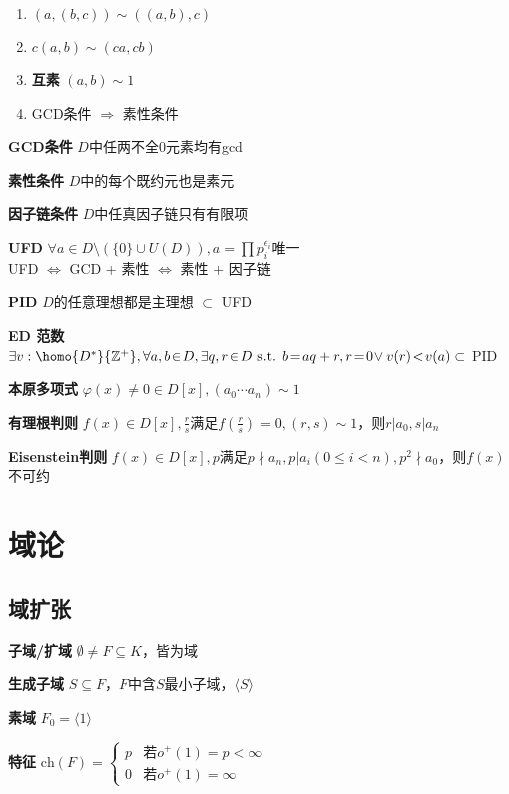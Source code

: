 \documentclass[a4paper,10pt]{ctexart}
\newcommand*{\setZ}{\mathbb{Z}}
\newcommand*{\st}{\text{ s.t. }}
\newcommand*{\impl}{\Rightarrow}
\renewcommand*{\iff}{\Leftrightarrow}
\renewcommand*{\leq}{\leqslant}
\newcommand*{\genfield}[1]{\langle #1 \rangle}
\newcommand*{\ch}[1]{\text{ch}(#1)}
\begin{document}
\begin{multicols}{3}
\begin{theorem}[gcd性质]
        \begin{enumerate}
            \item $(a, (b, c)) \sim ((a, b), c)$
            \item $c(a, b) \sim (ca, cb)$
            \item \textbf{互素} $(a, b) \sim 1$
            \item GCD条件 $\impl$ 素性条件
        \end{enumerate}
    \end{theorem}

    \textbf{GCD条件} $D$中任两不全0元素均有gcd

    \textbf{素性条件} $D$中的每个既约元也是素元

    \textbf{因子链条件} $D$中任真因子链只有有限项

    \textbf{UFD} $\forall a \!\in\! D \setminus (\{ 0 \} \!\cup\! U(D)), a \! = \! \prod p_i^{\epsilon_i}$唯一\\
    UFD $\iff$ GCD + 素性 $\iff$ 素性 + 因子链

    \textbf{PID} $D$的任意理想都是主理想 $\subset$ UFD

    \textbf{ED 范数} $\exists v: \homo{D^*}{\setZ^+}, \forall a, b \!\in\! D, \exists q, r \!\in\! D \st b \! = \! aq + r, r \! = \! 0 \!\vee v(r) \!<\! v(a) \subset$ PID

    \textbf{本原多项式} $\varphi(x) \!\ne\! 0 \!\in\! D[x], (a_0 \cdots a_n) \sim 1$

    \textbf{有理根判则} $f(x) \in D[x], \frac{r}{s}$满足$f(\frac{r}{s}) = 0, (r, s) \sim 1$，则$r | a_0, s | a_n$

    \textbf{Eisenstein判则} $f(x) \!\in\! D[x], p$满足$p \!\nmid\! a_n, p | a_i (0 \!\leq\! i \!<\! n), p^2 \nmid a_0$，则$f(x)$不可约

    \section{域论}

    \subsection{域扩张}

    \textbf{子域/扩域} $\emptyset \ne F \subseteq K$，皆为域

    \textbf{生成子域} $S \subseteq F$，$F$中含$S$最小子域，$\genfield{S}$

    \textbf{素域} $F_0 = \genfield{1}$

    \textbf{特征} $\ch{F} = \begin{cases}
            p & \text{若}o^+(1) = p < \infty \\
            0 & \text{若}o^+(1) = \infty
        \end{cases}$


\end{multicols}
\end{document}
